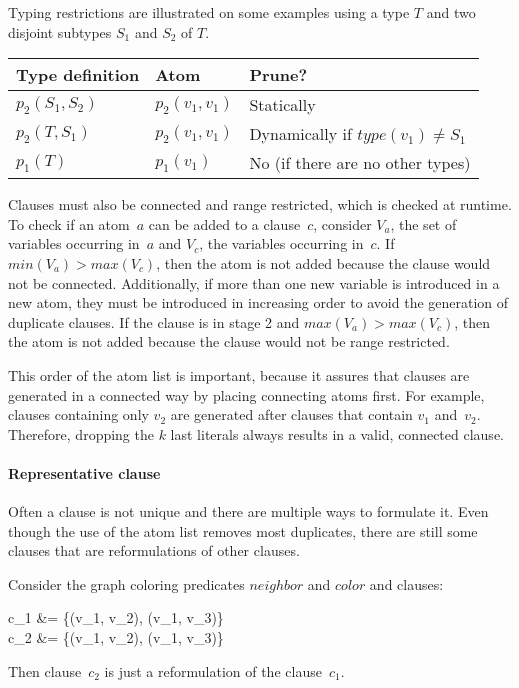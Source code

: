 \begin{example}
	Typing restrictions are illustrated on some examples using a type $T$ and two disjoint subtypes $S_1$ and $S_2$ of $T$.

	\begin{table}[!htp]
		\begin{tabularx}{\textwidth}{llX}
				\textbf{Type definition} & \textbf{Atom} & \textbf{Prune?} \\
				\toprule
				$p_2(S_1, S_2)$ & $p_2(v_1, v_1)$ & Statically \\
				$p_2(T, S_1)$ & $p_2(v_1, v_1)$ & Dynamically if $\mathit{type}(v_1) \neq S_1$ \\
				$p_1(T)$ & $p_1(v_1)$ & No (if there are no other types) 
		\end{tabularx}
	\end{table}

\end{example}

Clauses must also be connected and range restricted, which is checked at runtime.
To check if an atom~$a$ can be added to a clause~$c$, consider $V_a$, the set of variables occurring in~$a$ and $V_c$, the variables occurring in~$c$.
If $min(V_a) > max(V_c)$, then the atom is not added because the clause would not be connected.
Additionally, if more than one new variable is introduced in a new atom, they must be introduced in increasing order to avoid the generation of duplicate clauses.
If the clause is in stage 2 and $max(V_a) > max(V_c)$, then the atom is not added because the clause would not be range restricted.

This order of the atom list is important, because it assures that clauses are generated in a connected way by placing connecting atoms first.
For example, clauses containing only $v_2$ are generated after clauses that contain $v_1$ and~$v_2$.
Therefore, dropping the $k$ last literals always results in a valid, connected clause.

\paragraph{Representative clause}
Often a clause is not unique and there are multiple ways to formulate it.
Even though the use of the atom list removes most duplicates, there are still some clauses that are reformulations of other clauses.

\begin{example}
	Consider the graph coloring predicates $\mathit{neighbor}$ and $\mathit{color}$ and clauses:
	\begin{shiftedflalign*}
		c_1 &= \{\lnot {}(v_1, v_2), \lnot {}(v_1, v_3)\} \\
		c_2 &= \{\lnot {}(v_1, v_2), \lnot {}(v_1, v_3)\}
	\end{shiftedflalign*}
	Then clause~$c_2$ is just a reformulation of the clause~$c_1$.
\end{example}

